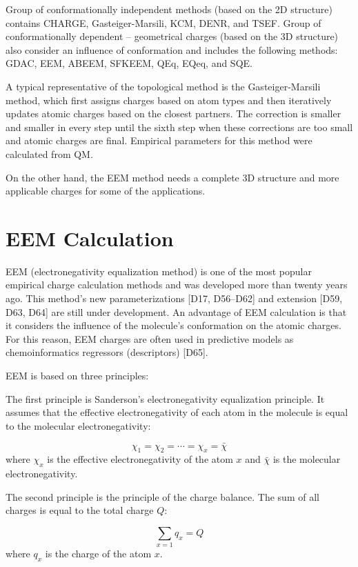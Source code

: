 Group of conformationally independent methods (based on the 2D structure)
contains CHARGE, Gasteiger-Marsili, KCM, DENR, and TSEF. Group of
conformationally dependent -- geometrical charges (based on the 3D structure)
also consider an influence of conformation and includes the following methods:
GDAC, EEM, ABEEM, SFKEEM, QEq, EQeq, and SQE.

A typical representative of the topological method is the Gasteiger-Marsili
method, which first assigns charges based on atom types and then iteratively
updates atomic charges based on the closest partners. The correction is smaller
and smaller in every step until the sixth step when these corrections are too
small and atomic charges are final. Empirical parameters for this method were
calculated from QM. 

On the other hand, the EEM method needs a complete 3D structure and more
applicable charges for some of the applications.

\section{EEM Calculation}

EEM (electronegativity equalization method) \cite{Mortier1986} is one of the
most popular empirical charge calculation methods and was developed more than
twenty years ago. This method's new parameterizations [D17, D56–D62] and
extension [D59, D63, D64] are still under development. An advantage of EEM
calculation is that it considers the influence of the molecule's conformation
on the atomic charges. For this reason, EEM charges are often used
in predictive models as chemoinformatics regressors (descriptors) [D65].

EEM is based on three principles: 

The first principle is Sanderson's electronegativity equalization principle.
It assumes that the effective electronegativity of each atom in the molecule
is equal to the molecular electronegativity:

\begin{equation}
    \chi_1 = \chi_2 = \cdots = \chi_x = \bar{\chi} 
\end{equation}
where $\chi_x$ is the effective electronegativity of the atom $x$ and
$\bar{\chi}$ is the molecular electronegativity.

The second principle is the principle of the charge balance. The sum of all
charges is equal to the total charge $Q$:

\begin{equation}
    \sum_{x=1} q_x = Q
\end{equation}
where $q_x$ is the charge of the atom $x$.

